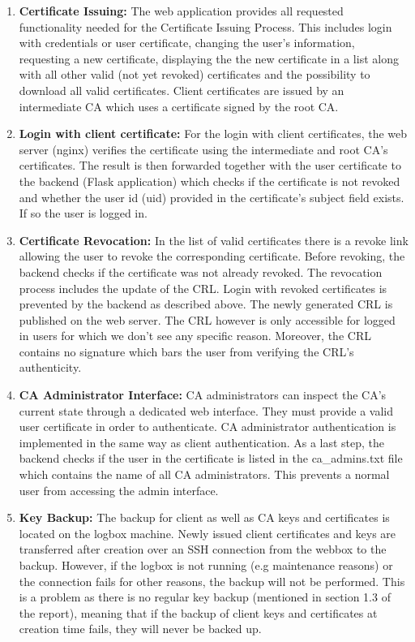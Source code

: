 \documentclass[english]{article}
\begin{document}
\begin{enumerate}

\item \textbf{Certificate Issuing:}
The web application provides all requested functionality needed for the Certificate Issuing Process. This includes login with credentials or user certificate, changing the user's information, requesting a new certificate, displaying the the new certificate in a list along with all other valid (not yet revoked) certificates and the possibility to download all valid certificates. Client certificates are issued by an intermediate CA which uses a certificate signed by the root CA. 

\item \textbf {Login with client certificate:}
For the login with client certificates, the web server (nginx) verifies the certificate using the intermediate and root CA's certificates. The result is then forwarded together with the user certificate to the backend (Flask application) which checks if the certificate is not revoked and whether the user id (uid) provided in the certificate's subject field exists. If so the user is logged in.

\item \textbf{Certificate Revocation:}
In the list of valid certificates there is a revoke link allowing the user to revoke the corresponding certificate. Before revoking, the backend  checks if the certificate was not already revoked. The revocation process includes the update of the CRL. Login with revoked certificates is prevented by the backend as described above. The newly generated CRL is published on the web server. The CRL however is only accessible for logged in users for which we don't see any specific reason. Moreover, the CRL contains no signature which bars the user from verifying the CRL's authenticity.

\item \textbf{CA Administrator Interface:}
CA administrators can inspect the CA's current state through a dedicated web interface. They must provide a valid user certificate in order to authenticate. CA administrator authentication is implemented in the same way as client authentication. As a last step, the backend checks if the user in the certificate is listed in the ca\_admins.txt file which contains the name of all CA administrators. This prevents a normal user from accessing the admin interface.

\item \textbf{Key Backup:}
The backup for client as well as CA keys and certificates is located on the logbox machine. Newly issued client certificates and keys are transferred after creation over an SSH connection from the webbox to the backup. However, if the logbox is not running (e.g maintenance reasons) or the connection fails for other reasons, the backup will not be performed. This is a problem as there is no regular key backup (mentioned in section 1.3 of the report), meaning that if the backup of client keys and certificates at creation time fails, they will never be backed up.


\end{enumerate}
\end{document}
